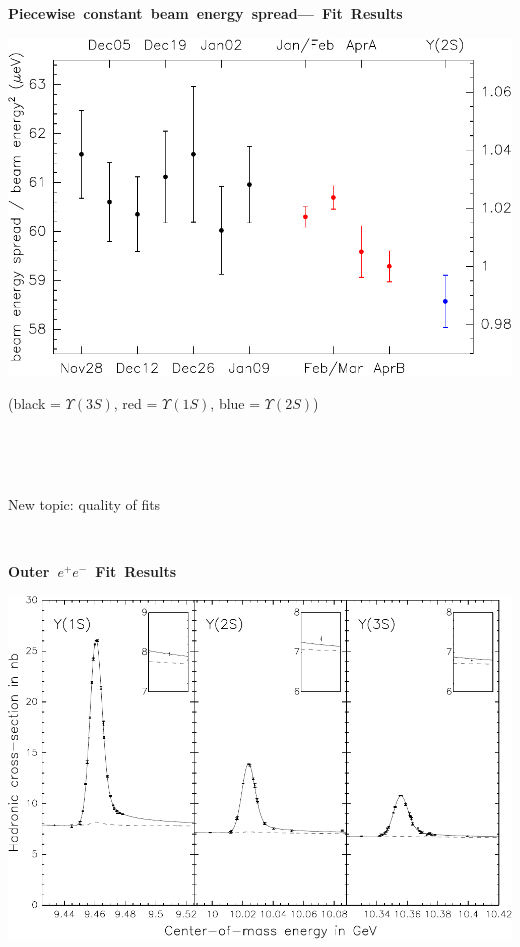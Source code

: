 \documentclass[landscape]{article}
\newenvironment{slide}[1][ ]{\mbox{\boldmath \bf #1 } \vfill}{\vfill \mbox{ } \pagebreak}
\begin{document}
\begin{slide}[Piecewise constant beam energy spread--- Fit Results]

\vfill

\begin{center}
  \includegraphics[width=0.9\linewidth]{piecewise_constant_beamspread}
\end{center}

\vfill
(black = $\Upsilon(3S)$, {\color{red} red} = $\Upsilon(1S)$, {\color{blue} blue} = $\Upsilon(2S)$)

\vspace{-1 cm}

\end{slide}

\begin{slide}

\begin{center}
  New topic: quality of fits
\end{center}

\end{slide}

\begin{slide}[Outer $e^+e^-$ Fit Results]

\vfill
\begin{center}
  \includegraphics[width=\linewidth]{octoberfits_fixen_2_10_three_resonances_inset_squat2}
\end{center}

\vspace{-1 cm}

\end{slide}
\end{document}
